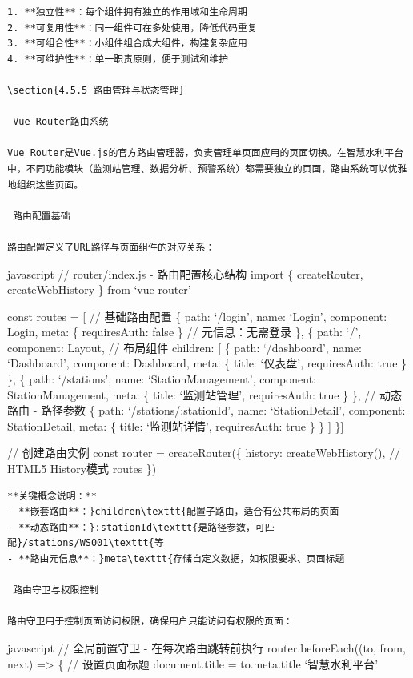 {{\begin{lstlisting}
1. **独立性**：每个组件拥有独立的作用域和生命周期
2. **可复用性**：同一组件可在多处使用，降低代码重复
3. **可组合性**：小组件组合成大组件，构建复杂应用
4. **可维护性**：单一职责原则，便于测试和维护

\section{4.5.5 路由管理与状态管理}

 Vue Router路由系统

Vue Router是Vue.js的官方路由管理器，负责管理单页面应用的页面切换。在智慧水利平台中，不同功能模块（监测站管理、数据分析、预警系统）都需要独立的页面，路由系统可以优雅地组织这些页面。

 路由配置基础

路由配置定义了URL路径与页面组件的对应关系：
\end{lstlisting}

javascript // router/index.js - 路由配置核心结构 import \{ createRouter, createWebHistory \} from `vue-router'

const routes = {[} // 基础路由配置 \{ path: `/login', name: `Login', component: Login, meta: \{ requiresAuth: false \} // 元信息：无需登录 \}, \{ path: `/', component: Layout, // 布局组件 children: {[} \{ path: `/dashboard', name: `Dashboard', component: Dashboard, meta: \{ title: `仪表盘', requiresAuth: true \} \}, \{ path: `/stations', name: `StationManagement', component: StationManagement, meta: \{ title: `监测站管理', requiresAuth: true \} \}, // 动态路由 - 路径参数 \{ path: `/stations/:stationId', name: `StationDetail', component: StationDetail, meta: \{ title: `监测站详情', requiresAuth: true \} \} {]} \}{]}

// 创建路由实例 const router = createRouter(\{ history: createWebHistory(), // HTML5 History模式 routes \})

\begin{lstlisting}
**关键概念说明：**
- **嵌套路由**：}children\texttt{配置子路由，适合有公共布局的页面
- **动态路由**：}:stationId\texttt{是路径参数，可匹配}/stations/WS001\texttt{等
- **路由元信息**：}meta\texttt{存储自定义数据，如权限要求、页面标题

 路由守卫与权限控制

路由守卫用于控制页面访问权限，确保用户只能访问有权限的页面：
\end{lstlisting}

javascript // 全局前置守卫 - 在每次路由跳转前执行 router.beforeEach((to, from, next) =\textgreater{} \{ // 设置页面标题 document.title = to.meta.title \textbar\textbar{} `智慧水利平台'

}}
